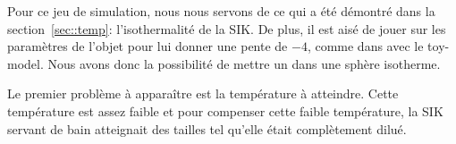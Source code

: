 Pour ce jeu de simulation, nous nous servons de ce qui a été démontré dans la section~\ref{sec::temp}:
l'isothermalité de la SIK. De plus, il est aisé de jouer sur les paramètres de l'objet pour lui donner
une pente de $-4$, comme dans avec le toy-model. Nous avons donc la possibilité de mettre un 
dans une sphère isotherme.

Le premier problème à apparaître est la température à atteindre. Cette température est assez faible
et pour compenser cette faible température, la SIK servant de bain atteignait des tailles tel qu'elle
était complètement dilué.
